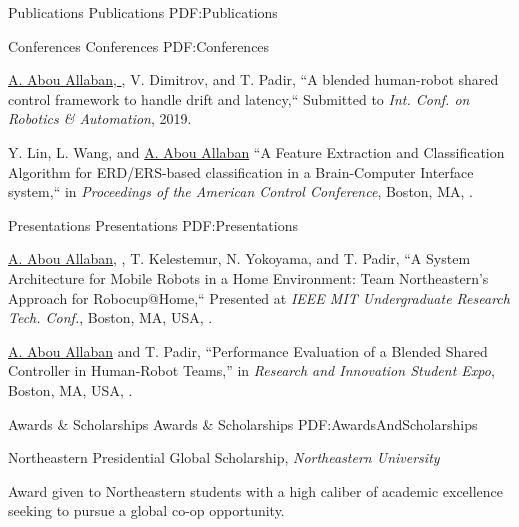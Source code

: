 \documentclass[letterpaper,MMMyyyy,nonstopmode]{simpleresumecv}
\begin{document}
\begin{Body}
\Section
{Publications}
{Publications}
{PDF:Publications}


\SubSection
{Conferences}
{Conferences}
{PDF:Conferences}

\begingroup
\renewcommand{\MaxNumberedItem}{[8888]}

\BigGap
\NumberedItem{[1]}
{\underline{A. Abou Allaban, }, V. Dimitrov, and T. Padir, 
``A blended human-robot shared control framework to handle drift and latency,``
Submitted to \textit{Int. Conf. on Robotics \& Automation}, 2019.}

\Gap
\NumberedItem{[2]}
{Y. Lin, L. Wang, and \underline{A. Abou Allaban}
``A Feature Extraction and Classification Algorithm for ERD/ERS-based classification in a Brain-Computer Interface system,``
in \textit{Proceedings of the American Control Conference},
Boston, MA,
.}

\endgroup


\BigGap
\SubSection
{Presentations}
{Presentations}
{PDF:Presentations}


\begingroup
\renewcommand{\MaxNumberedItem}{[8888]}

\BigGap
\NumberedItem{[1]}
{\underline{A. Abou Allaban,} , T. Kelestemur, N. Yokoyama, and T. Padir,
``A System Architecture for Mobile Robots in a Home Environment: Team Northeastern’s Approach for Robocup@Home,``
Presented at \textit{IEEE MIT Undergraduate Research Tech. Conf.}, 
Boston, MA, USA,
.}

\Gap
\NumberedItem{[2]}
{\underline{A. Abou Allaban} and T. Padir,
``Performance Evaluation of a Blended Shared Controller in Human-Robot Teams,''
in \textit{Research and Innovation Student Expo},
Boston, MA, USA,
.}

\endgroup


\Section
{Awards \&\newline
Scholarships}
{Awards \& Scholarships}
{PDF:AwardsAndScholarships}

\Gap
\BulletItem
Northeastern Presidential Global Scholarship,
\textit{Northeastern University}
\hfill
{}
\begin{Detail}
\Item
Award given to Northeastern students with a high caliber of academic excellence seeking to pursue a global co-op opportunity.
\end{Detail}


\end{Body}
\end{document}

